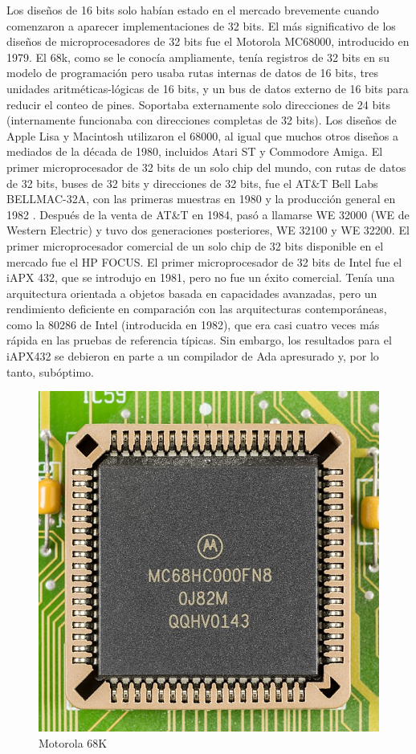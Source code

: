 Los diseños de 16 bits solo habían estado en el mercado brevemente cuando comenzaron a aparecer implementaciones de 32 bits.
El más significativo de los diseños de  microprocesadores de 32 bits fue el Motorola MC68000, introducido en 1979. 
El 68k, como se le conocía ampliamente, tenía  registros de 32 bits en su modelo de programación pero usaba rutas internas
de datos de 16 bits, tres unidades aritméticas-lógicas de 16 bits, y un bus de datos externo de 16 bits para reducir 
el conteo de pines. Soportaba externamente solo direcciones de 24 bits (internamente funcionaba con direcciones completas de 
32 bits). Los diseños de Apple Lisa y Macintosh utilizaron el 68000, al igual que muchos otros diseños a mediados de la década de 
1980, incluidos Atari ST y Commodore Amiga. El primer microprocesador de 32 bits de un solo chip del mundo, con rutas de datos de 
32 bits, buses de 32 bits y direcciones de 32 bits, fue el AT\&T Bell Labs BELLMAC-32A, con las primeras muestras en 1980 y la producción general en 1982 . 
Después de la venta de AT\&T en 1984, pasó a llamarse WE 32000 (WE de Western Electric) y tuvo dos generaciones posteriores, WE 32100 y WE 32200.
El primer microprocesador comercial de un solo chip de 32 bits disponible en el mercado fue el HP FOCUS.
El primer microprocesador de 32 bits de Intel fue el iAPX 432, que se introdujo en 1981, pero no fue un éxito comercial. Tenía una arquitectura orientada 
a objetos basada en capacidades avanzadas, pero un rendimiento deficiente en comparación con las arquitecturas contemporáneas, como la 80286 de Intel 
(introducida en 1982), que era casi cuatro veces más rápida en las pruebas de referencia típicas. Sin embargo, los resultados para el iAPX432 se 
debieron en parte a un compilador de Ada apresurado y, por lo tanto, subóptimo.

\begin{figure}[htb]
	\centering
	\includegraphics[scale = 0.15]{Graphics/Motorola_MC68HC000FN8-0695.jpg}
	\caption{Motorola 68K}
	\label{fig:17}
\end{figure}

